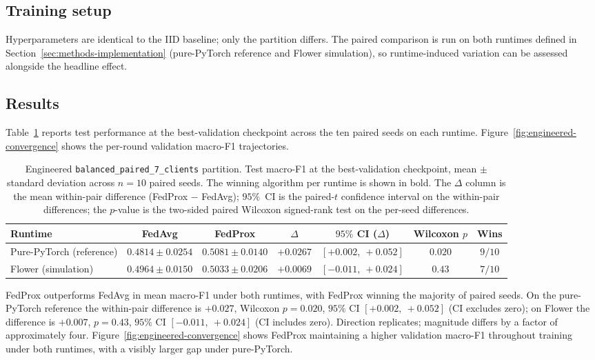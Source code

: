 \documentclass[11pt,a4paper]{report}
\begin{document}
\subsection{Training setup}
\label{sec:engineered-setup}

Hyperparameters are identical to the IID baseline; only the
partition differs. The paired comparison is run on both runtimes
defined in Section~\ref{sec:methods-implementation} (pure-PyTorch
reference and Flower simulation), so runtime-induced variation
can be assessed alongside the headline effect.

\subsection{Results}
\label{sec:engineered-results}

Table~\ref{tab:engineered-results} reports test performance at
the best-validation checkpoint across the ten paired seeds on
each runtime. Figure~\ref{fig:engineered-convergence} shows the
per-round validation macro-F1 trajectories.

\begin{table}[!htbp]
\centering
\caption{Engineered \texttt{balanced\_paired\_7\_clients}
partition. Test macro-F1 at the best-validation checkpoint, mean
$\pm$ standard deviation across $n = 10$ paired seeds. The winning
algorithm per runtime is shown in bold. The $\Delta$ column is the
mean within-pair difference (FedProx $-$ FedAvg); $95\%$~CI is the
paired-$t$ confidence interval on the within-pair differences; the
$p$-value is the two-sided paired Wilcoxon signed-rank test on the
per-seed differences.}
\label{tab:engineered-results}
\small
\setlength{\tabcolsep}{4pt}
\begin{tabular}{lcccccc}
\toprule
Runtime & FedAvg & FedProx & $\Delta$ & $95\%$ CI ($\Delta$) & Wilcoxon $p$ & Wins \\
\midrule
Pure-PyTorch (reference) & $0.4814 \pm 0.0254$ & $\mathbf{0.5081 \pm 0.0140}$ & $+0.0267$ & $[+0.002,\ +0.052]$ & $0.020$ & $9/10$ \\
Flower (simulation)      & $0.4964 \pm 0.0150$ & $\mathbf{0.5033 \pm 0.0206}$ & $+0.0069$ & $[-0.011,\ +0.024]$ & $0.43$  & $7/10$ \\
\bottomrule
\end{tabular}
\end{table}

FedProx outperforms FedAvg in mean macro-F1 under both runtimes,
with FedProx winning the majority of paired seeds. On the
pure-PyTorch reference the within-pair difference is $+0.027$,
Wilcoxon $p = 0.020$, $95\%$ CI $[+0.002,\ +0.052]$ (CI excludes
zero); on Flower the difference is $+0.007$, $p = 0.43$, $95\%$
CI $[-0.011,\ +0.024]$ (CI includes zero). Direction replicates;
magnitude differs by a factor of approximately four.
Figure~\ref{fig:engineered-convergence} shows FedProx maintaining
a higher validation macro-F1 throughout training under both
runtimes, with a visibly larger gap under pure-PyTorch.
\end{document}
